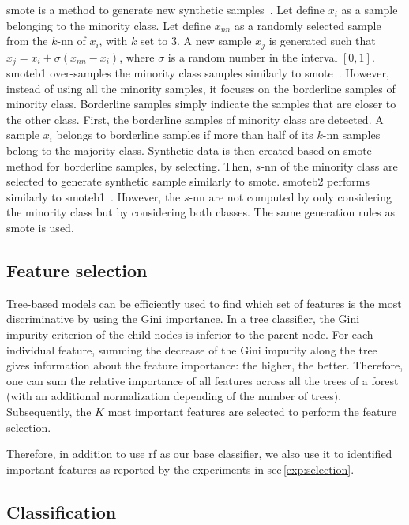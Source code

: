 \documentclass[final,3p,times,twocolumn]{elsarticle}
\begin{document}
\Ac{smote} is a method to generate new synthetic
samples~\cite{chawla2002smote}. Let define $x_i$ as a sample belonging to the
minority class. Let define $x_{nn}$ as a randomly selected sample from the
$k$-\ac{nn} of $x_i$, with $k$ set to 3. A new sample $x_j$ is generated such
that $x_j = x_i + \sigma \left( x_{nn} - x_i \right)$, where $\sigma$ is a
random number in the interval $\left[0,1\right]$. \Ac{smoteb1} over-samples the
minority class samples similarly to \ac{smote}~\cite{han2005borderline}.
However, instead of using all the minority samples, it focuses on the
borderline samples of minority class.  Borderline samples simply indicate the
samples that are closer to the other class. First, the borderline samples of
minority class are detected. A sample $x_{i}$ belongs to borderline samples if
more than half of its $k$-\ac{nn} samples belong to the majority
class. Synthetic data is then created based on \ac{smote} method for borderline
samples, by selecting. Then, $s$-\ac{nn} of the minority class are selected to
generate synthetic sample similarly to \ac{smote}. \Ac{smoteb2} performs
similarly to \ac{smoteb1}~\cite{han2005borderline}.  However, the $s$-\ac{nn}
are not computed by only considering the minority class but by considering both
classes. The same generation rules as \ac{smote} is used.

\subsection{Feature selection}\label{features:selection}

Tree-based models can be efficiently used to find which set of features is the
most discriminative by using the Gini importance. In a tree classifier, the
Gini impurity criterion of the child nodes is inferior to the parent node. For
each individual feature, summing the decrease of the Gini impurity along the
tree gives information about the feature importance: the higher, the
better. Therefore, one can sum the relative importance of all features across
all the trees of a forest (with an additional normalization depending of the
number of trees). Subsequently, the $K$ most important features are selected to
perform the feature selection.

Therefore, in addition to use \ac{rf} as our base classifier, we also use it to
identified important features as reported by the experiments in
\acs{sec}\,\ref{exp:selection}.

\subsection{Classification}
\end{document}
